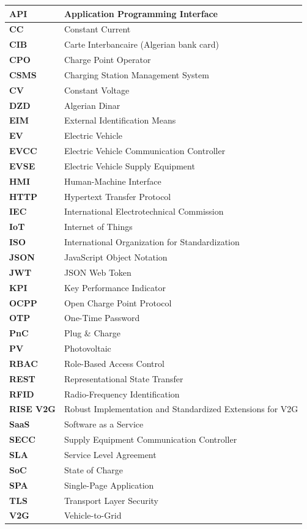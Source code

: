 \documentclass[12pt,a4paper]{report}
\begin{document}
\begin{longtable}{|>{\bfseries}p{3.2cm}|p{10.5cm}|}
  \hline
  API    & Application Programming Interface \\ \hline
  CC     & Constant Current \\ \hline
  CIB    & Carte Interbancaire (Algerian bank card) \\ \hline
  CPO    & Charge Point Operator \\ \hline
  CSMS   & Charging Station Management System \\ \hline
  CV     & Constant Voltage \\ \hline
  DZD    & Algerian Dinar \\ \hline
  EIM    & External Identification Means \\ \hline
  EV     & Electric Vehicle \\ \hline
  EVCC   & Electric Vehicle Communication Controller \\ \hline
  EVSE   & Electric Vehicle Supply Equipment \\ \hline
  HMI    & Human-Machine Interface \\ \hline
  HTTP   & Hypertext Transfer Protocol \\ \hline
  IEC    & International Electrotechnical Commission \\ \hline
  IoT    & Internet of Things \\ \hline
  ISO    & International Organization for Standardization \\ \hline
  JSON   & JavaScript Object Notation \\ \hline
  JWT    & JSON Web Token \\ \hline
  KPI    & Key Performance Indicator \\ \hline
  OCPP   & Open Charge Point Protocol \\ \hline
  OTP    & One-Time Password \\ \hline
  PnC    & Plug \& Charge \\ \hline
  PV     & Photovoltaic \\ \hline
  RBAC   & Role-Based Access Control \\ \hline
  REST   & Representational State Transfer \\ \hline
  RFID   & Radio-Frequency Identification \\ \hline
  RISE V2G & Robust Implementation and Standardized Extensions for V2G \\ \hline
  SaaS   & Software as a Service \\ \hline
  SECC   & Supply Equipment Communication Controller \\ \hline
  SLA    & Service Level Agreement \\ \hline
  SoC    & State of Charge \\ \hline
  SPA    & Single-Page Application \\ \hline
  TLS    & Transport Layer Security \\ \hline
  V2G    & Vehicle-to-Grid \\ \hline
\end{longtable}
\end{document}
